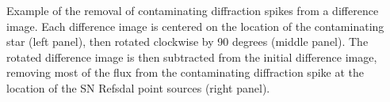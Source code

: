 \label{fig:Despiking}
Example of the removal of contaminating diffraction spikes from a difference image. Each difference image is centered on the location of the contaminating star (left panel), then rotated clockwise by 90 degrees (middle panel). The rotated difference image is then subtracted from the initial difference image, removing most of the flux from the contaminating diffraction spike at the location of the SN Refsdal point sources (right panel).